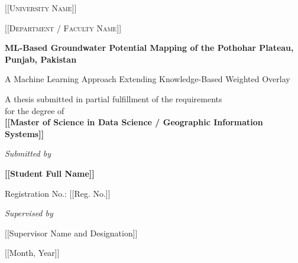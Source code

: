 \begin{titlepage}
\centering
\thispagestyle{empty}

{\scshape\large [[University Name]]\par}
{\scshape [[Department / Faculty Name]]\par}
\vspace{0.8cm}


\vfill
{\Huge\bfseries ML-Based Groundwater Potential Mapping of the Pothohar Plateau, Punjab, Pakistan\par}
\vspace{0.5cm}
{\large A Machine Learning Approach Extending Knowledge-Based Weighted Overlay\par}
\vfill

{\large A thesis submitted in partial fulfillment of the requirements\\
for the degree of\\[0.3cm]
\textbf{[[Master of Science in Data Science / Geographic Information Systems]]}\par}

\vfill
{\large\itshape Submitted by\par}
{\Large\bfseries [[Student Full Name]]\par}
{\large Registration No.: [[Reg. No.]]\par}

\vspace{0.8cm}
{\large\itshape Supervised by\par}
{\Large [[Supervisor Name and Designation]]\par}

\vfill
{\large [[Month, Year]]\par}

\end{titlepage}
\cleardoublepage
